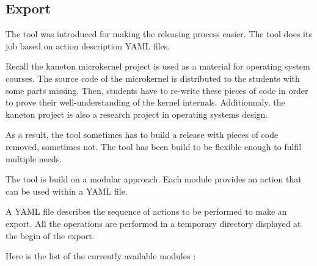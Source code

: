 %
%
%
%
%
%

%
%

\subsection{Export}
\label{section:export}

The  tool was introduced for making the releasing process
easier. The tool does its job based on action description YAML files.

Recall the kaneton microkernel project is used as a material for operating
system courses. The source code of the microkernel is distributed to
the students with some parts missing. Then, students have to re-write
these pieces of code in order to prove their well-understanding of the
kernel internals. Additionnaly, the kaneton project is also a research project
in operating systems design.

As a result, the  tool sometimes has to build a release
with pieces of code removed, sometimes not. The tool has been build to
be flexible enough to fulfil multiple needs.

The tool is build on a modular approach. Each module provides an action that
can be used within a YAML file.

A YAML file describes the sequence of actions to be performed to make an export. All the operations are performed in a temporary directory displayed at the begin of the export.

Here is the list of the currently available modules :

